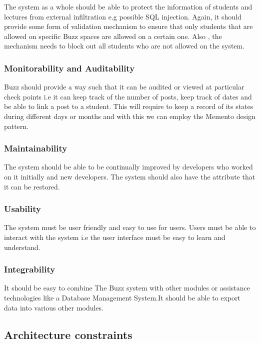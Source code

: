 \documentclass[10pt]{article}
\begin{document}
The system as a whole should be able to protect the information of students and lectures from external infiltration e.g possible SQL injection. Again, it should provide some form of validation mechanism to ensure that only students that are allowed on specific Buzz spaces are allowed on a certain one. Also , the mechanism needs to block out all students who are not allowed on the system.

\subsubsection{Monitorability and Auditability}

Buzz should provide a way such that it can be audited or viewed at particular check points  i.e it can keep track of the number
of posts, keep track of dates and be able to link a post to a student. This will require to keep a record of its states during different days or months and with this we can employ the Memento design pattern.

\subsubsection{Maintainability}

The system should be able to be continually improved by developers who worked on it initially and new developers.
The system should also have the attribute that it can be restored.

\subsubsection{Usability}

The system must be user friendly and easy to use for users. Users must be able to interact with the system i.e the user interface must be easy to learn and understand.

\subsubsection{Integrability}

It should be easy to combine The Buzz system with other modules or assistance technologies like a Database Management System.It should be able to export data into various other modules.


\clearpage

\subsection{Architecture constraints} %
\end{document}
